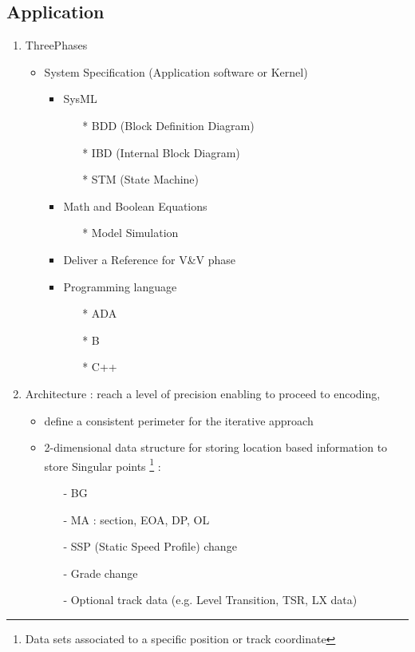 \documentclass{template/openetcs_report}
\begin{document}
\subsection{Application}
\begin{enumerate}
\item ThreePhases
\begin{itemize}
\item System Specification (Application software or Kernel)
\begin{itemize}
\item SysML
\begin{itemize}
\item[*]BDD (Block Definition Diagram)
\item[*]IBD (Internal Block Diagram)
\item[*]STM (State Machine)
\end{itemize}
\item Math and Boolean Equations
\begin{itemize}
\item[*] Model Simulation 
\end{itemize}
\item Deliver a Reference for V\&V phase
\item Programming language
\begin{itemize}
\item[*]ADA
\item[*]B
\item[*]C++
\end{itemize}
\end{itemize}
\end{itemize}

\item Architecture : reach a level of precision enabling to proceed to encoding,
\begin{itemize}
\item define a consistent perimeter for the iterative approach
\item 2-dimensional data structure for storing location based information
to store Singular points \footnote{Data sets associated to a specific position or track coordinate} :
\begin{itemize}
\item[-]BG
\item[-]MA  : section, EOA, DP, OL
\item[-]SSP (Static Speed Profile) change
\item[-]Grade change
\item[-]Optional track data (e.g. Level Transition, TSR, LX data)
\end{itemize}


\end{itemize}
\end{enumerate}
\end{document}
